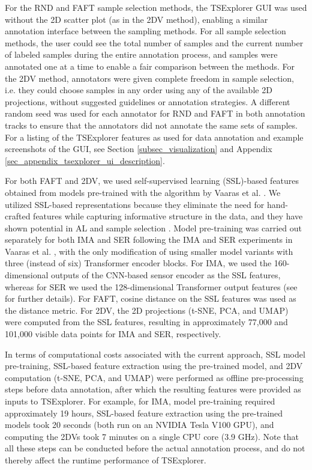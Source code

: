 \documentclass[a4paper,fleqn]{cas-dc}
\begin{document}
For the RND and FAFT sample selection methods, the TSExplorer GUI was used without the 2D scatter plot (as in the 2DV method), enabling a similar annotation interface between the sampling methods. For all sample selection methods, the user could see the total number of samples and the current number of labeled samples during the entire annotation process, and samples were annotated one at a time to enable a fair comparison between the methods. For the 2DV method, annotators were given complete freedom in sample selection, i.e. they could choose samples in any order using any of the available 2D projections, without suggested guidelines or annotation strategies. A different random seed was used for each annotator for RND and FAFT in both annotation tracks to ensure that the annotators did not annotate the same sets of samples. For a listing of the TSExplorer features as used for data annotation and example screenshots of the GUI, see Section \ref{subsec_visualization} and Appendix \ref{sec_appendix_tsexplorer_ui_description}.

For both FAFT and 2DV, we used self-supervised learning (SSL)-based features obtained from models pre-trained with the algorithm by Vaaras et al. \cite{pfml}. We utilized SSL-based representations because they eliminate the need for hand-crafted features while capturing informative structure in the data, and they have shown potential in AL and sample selection \cite{interpretability_driven_sample_selection_ssl, vaaras22_interspeech, issl_al, ssl_class_balanced_al, density_based_al_ssl}. Model pre-training was carried out separately for both IMA and SER following the IMA and SER experiments in Vaaras et al. \cite{pfml}, with the only modification of using smaller model variants with three (instead of six) Transformer encoder blocks. For IMA, we used the 160-dimensional outputs of the CNN-based sensor encoder as the SSL features, whereas for SER we used the 128-dimensional Transformer output features (see \cite{pfml} for further details). For FAFT, cosine distance on the SSL features was used as the distance metric. For 2DV, the 2D projections (t-SNE, PCA, and UMAP) were computed from the SSL features, resulting in approximately 77,000 and 101,000 visible data points for IMA and SER, respectively.

In terms of computational costs associated with the current approach, SSL model pre-training, SSL-based feature extraction using the pre-trained model, and 2DV computation (t-SNE, PCA, and UMAP) were performed as offline pre-processing steps before data annotation, after which the resulting features were provided as inputs to TSExplorer. For example, for IMA, model pre-training required approximately 19 hours, SSL-based feature extraction using the pre-trained models took 20 seconds (both run on an NVIDIA Tesla V100 GPU), and computing the 2DVs took 7 minutes on a single CPU core (3.9 GHz). Note that all these steps can be conducted before the actual annotation process, and do not thereby affect the runtime performance of TSExplorer.
\end{document}
